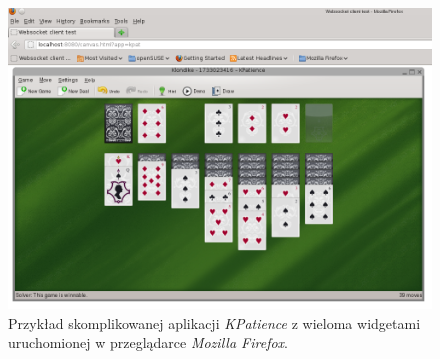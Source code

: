 \begin{figure}
\centering
\includegraphics[width=0.7\linewidth]{img/example}
\caption{Przykład skomplikowanej aplikacji \emph{KPatience} z wieloma widgetami uruchomionej w przeglądarce \emph{Mozilla Firefox}.}
\label{fig:example}
\end{figure}
